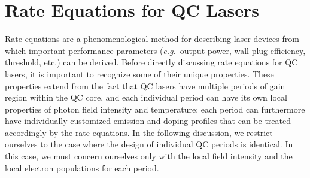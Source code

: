 \documentclass[12pt]{report}
\begin{document}
\section{Rate Equations for QC Lasers}
Rate equations are a phenomenological method for describing laser devices from which important performance parameters (\emph{e.g.}\ output power, wall-plug efficiency, threshold, etc.) can be derived.  Before directly discussing rate equations for QC lasers, it is important to recognize some of their unique properties.  These properties extend from the fact that QC lasers have multiple periods of gain region within the QC core, and each individual period can have its own local properties of photon field intensity and temperature; each period can furthermore have individually-customized emission \cite{Gmachl:2002:Nature:broadband} and doping profiles \cite{Hoffman:OptExp:2007} that can be treated accordingly by the rate equations. In the following discussion, we restrict ourselves to the case where the design of individual QC periods is identical.  In this case, we must concern ourselves only with the local field intensity and the local electron populations for each period.
\end{document}
